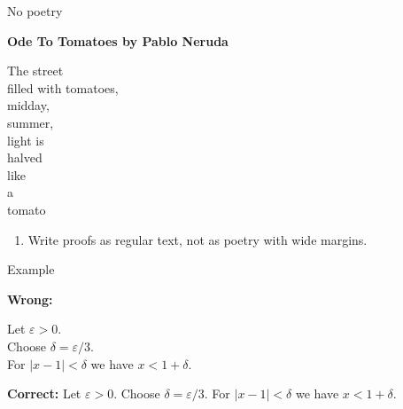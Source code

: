 \documentclass[professionalfonts]{beamer}%
\newenvironment{handlist}{
  \begin{enumerate}[\leftthumbsup]
    \addtolength{\itemsep}{-0.3\itemsep}}
  {\end{enumerate}}
\begin{document}
\begin{frame}[fragile]{No poetry}{}%

\textbf{Ode To Tomatoes by Pablo Neruda}

The street\\
filled with tomatoes,\\
midday,\\
summer,\\
light is\\
halved\\
like\\
a\\
tomato \\

\begin{handlist}

\item Write proofs as regular text, not as poetry with wide margins.
\end{handlist}




\end{frame}
\begin{frame}[fragile]{}{}%


\begin{block}{Example}

\textbf{Wrong:}
\begin{centering}
Let \(\varepsilon > 0\). \\
Choose \(\delta = \varepsilon / 3 \). \\
For \(|x - 1| < \delta \) we have \(x < 1 + \delta\). \\
\end{centering}

\vspace{0.1in}

\textbf{Correct:} Let \(\varepsilon > 0\). Choose \(\delta = \varepsilon / 3 \).  For \(|x - 1| < \delta \) we have \(x < 1 + \delta\). 
\end{block}

\vfill
\end{frame}
\end{document}
